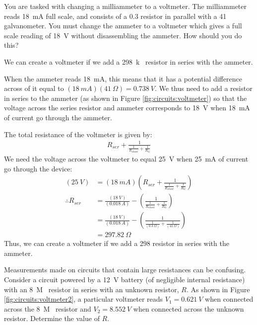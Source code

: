\question You are tasked with changing a milliammeter to a voltmeter. The milliammeter reads \SI{18}{mA} full scale, and consists of a \SI{0.3}{\Omega} resistor in parallel with a \SI{41}{\Omega} galvanometer. You must change the ammeter to a voltmeter which gives a full scale reading of \SI{18}{V} without disassembling the ammeter. How should you do this?
\begin{finalanswer}
We can create a voltmeter if we add a \SI{298}{k\Omega} resistor in series with the ammeter.
\end{finalanswer} 
\begin{solution}
When the ammeter reads \SI{18}{mA}, this means that it has a potential difference across of it equal to $(\SI{18}{mA})(\SI{41}{\Omega})=\SI{0.738}{V}$. We thus need to add a resistor in series to the ammeter (as shown in Figure \ref{fig:circuits:voltmeter}) so that the voltage across the series resistor and ammeter corresponds to \SI{18}{V} when \SI{18}{mA} of current go through the ammeter.

The total resistance of the voltmeter is given by:
\begin{align*}
R_{ser}+\frac{1}{\frac{1}{R_{shunt}}+\frac{1}{R_G}}
\end{align*}
We need the voltage across the voltmeter to equal \SI{25}{V} when \SI{25}{mA} of current go through the device:
\begin{align*}
(\SI{25}{V})&=(\SI{18}{mA})\left(R_{ser}+\frac{1}{\frac{1}{R_{shunt}}+\frac{1}{R_G}}\right)\\
\therefore R_{ser}&=\frac{(\SI{18}{V})}{(\SI{0.018}{A})}-\left(\frac{1}{\frac{1}{R_{shunt}}+\frac{1}{R_G}}\right)\\
&=\frac{(\SI{18}{V})}{(\SI{0.018}{A})}-\left(\frac{1}{\frac{1}{(\SI{0.3}{\Omega})}+\frac{1}{(\SI{41}{\Omega})}}\right)\\
&=\SI{297.82}{\Omega}
\end{align*}
Thus, we can create a voltmeter if we add a \SI{298}{\Omega} resistor in series with the ammeter. 
\end{solution}

\question Measurements made on circuits that contain large resistances can be confusing. Consider a circuit powered by a \SI{12}{V} battery (of negligible internal resistance) with an \SI{8}{M\Omega} resistor in series with an unknown resistor, $R$. As shown in Figure \ref{fig:circuits:voltmeter2}, a particular voltmeter reads $V_1=\SI{0.621}{V}$ when connected across the  \SI{8}{M\Omega} resistor and $V_2=\SI{8.552}{V}$ when connected across the unknown resistor. Determine the value of $R$. 
 
